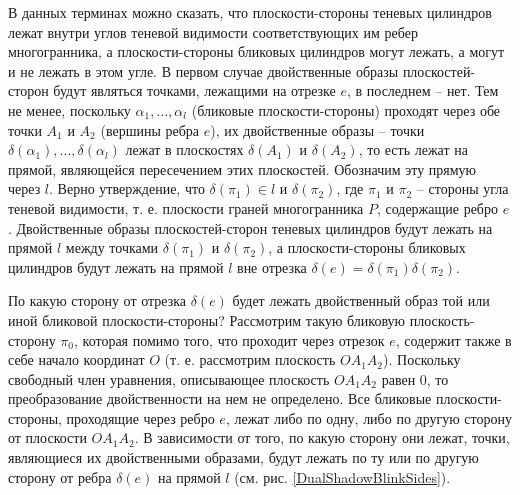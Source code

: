 \documentclass[a4paper, 12pt, titlepage]{article}
\theoremstyle{definition}
\theoremstyle{plain}
\theoremstyle{plain}
\begin{document}
В данных терминах можно сказать, что плоскости-стороны теневых цилиндров лежат
внутри углов теневой видимости соответствующих им ребер многогранника, а
плоскости-стороны бликовых цилиндров могут лежать, а могут и не лежать в этом
угле. В первом случае двойственные образы плоскостей-сторон будут являться
точками, лежащими на отрезке $e$, в последнем -- нет. Тем не менее, поскольку
$\alpha_{1}, \ldots, \alpha_{l}$ (бликовые плоскости-стороны) проходят через
обе точки $A_{1}$ и $A_{2}$ (вершины ребра $e$), их двойственные образы -- точки
$\delta(\alpha_{1}), \ldots, \delta(\alpha_{l})$ лежат в плоскостях
$\delta(A_{1})$ и $\delta(A_{2})$, то есть лежат на прямой, являющейся
пересечением этих плоскостей. Обозначим эту прямую через $l$. Верно утверждение,
что $\delta(\pi_{1}) \in l$ и $\delta(\pi_{2})$, где $\pi_{1}$ и $\pi_{2}$ --
стороны угла теневой видимости, т. е. плоскости граней многогранника $P$,
содержащие ребро $e$. Двойственные образы плоскостей-сторон теневых цилиндров
будут лежать на прямой $l$ между точками $\delta(\pi_{1})$ и $\delta(\pi_{2})$,
а плоскости-стороны бликовых цилиндров будут лежать на прямой $l$ вне отрезка
$\delta(e) = \delta(\pi_{1}) \delta(\pi_{2})$.

По какую сторону от отрезка $\delta(e)$ будет лежать двойственный образ той или 
иной бликовой плоскости-стороны? Рассмотрим такую бликовую плоскость-сторону 
$\pi_{0}$, которая помимо того, что проходит через отрезок $e$, содержит также 
в себе начало координат $O$ (т. е. рассмотрим плоскость $O A_{1} A_{2}$). 
Поскольку свободный член уравнения, описывающее плоскость $O A_{1} A_{2}$
равен $0$, то преобразование двойственности на нем не определено. Все бликовые 
плоскости-стороны, проходящие через ребро $e$, лежат либо по одну, либо по 
другую сторону от плоскости $O A_{1} A_{2}$. В зависимости от того, по какую 
сторону они лежат, точки, являющиеся их двойственными образами, будут лежать
по ту или по другую сторону от ребра $\delta(e)$ на прямой $l$ (см. рис.
\ref{DualShadowBlinkSides}).
\end{document}
